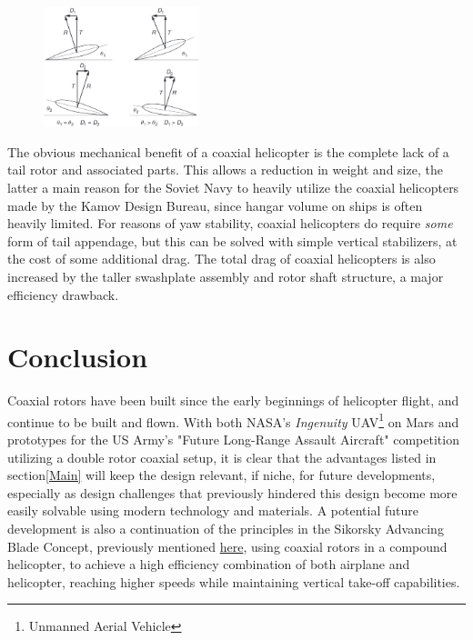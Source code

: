 \documentclass[11pt, a4paper]{scrartcl}
\begin{document}
\begin{figure}
    {\includegraphics[width=0.4\textwidth]{Yawcontrol.png}}
\end{figure}
The obvious mechanical benefit of a coaxial helicopter is the complete lack of a tail rotor and associated parts. This allows a reduction in weight and size, the latter a main reason for the Soviet Navy to heavily utilize the coaxial helicopters made by the Kamov Design Bureau, since hangar volume on ships is often heavily limited. For reasons of yaw stability, coaxial helicopters do require \emph{some} form of tail appendage, but this can be solved with simple vertical stabilizers, at the cost of some additional drag. The total drag of coaxial helicopters is also increased by the taller swashplate assembly and rotor shaft structure, a major efficiency drawback. 

\section{Conclusion\label{Conc}}
Coaxial rotors have been built since the early beginnings of helicopter flight, and continue to be built and flown. With both NASA's \emph{Ingenuity} UAV\footnote{Unmanned Aerial Vehicle} on Mars and prototypes for the US Army's "Future Long-Range Assault Aircraft" competition utilizing a double rotor coaxial setup, it is clear that the advantages listed in section\ref{Main} will keep the design relevant, if niche, for future developments, especially as design challenges that previously hindered this design become more easily solvable using modern technology and materials. A potential future development is also a continuation of the principles in the Sikorsky Advancing Blade Concept, previously mentioned \hyperlink{Sikorsky}{here}, using coaxial rotors in a compound helicopter, to achieve a high efficiency combination of both airplane and helicopter, reaching higher speeds while maintaining vertical take-off capabilities. 

\printbibliography
\end{document}
